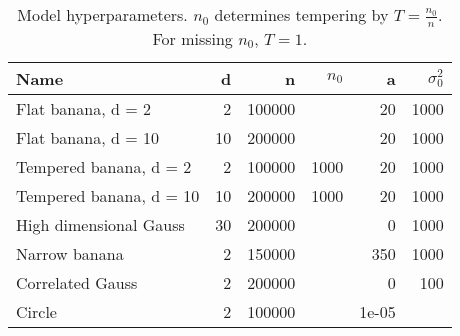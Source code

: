 \begin{table}
\centering
\caption{
            Model hyperparameters. $n_0$ determines tempering by \(T=\frac{n_0}{n}\).
            For missing $n_0$, \(T = 1\).
            }
\label{model_params_table}
\begin{tabular}{lrrrrr}
\toprule
                    Name &   d &       n &  $n_0$ &     a &  $\sigma^2_0$ \\
\midrule
      Flat banana, d = 2 &   2 &  100000 &        &    20 &          1000 \\
     Flat banana, d = 10 &  10 &  200000 &        &    20 &          1000 \\
  Tempered banana, d = 2 &   2 &  100000 &   1000 &    20 &          1000 \\
 Tempered banana, d = 10 &  10 &  200000 &   1000 &    20 &          1000 \\
  High dimensional Gauss &  30 &  200000 &        &     0 &          1000 \\
           Narrow banana &   2 &  150000 &        &   350 &          1000 \\
        Correlated Gauss &   2 &  200000 &        &     0 &           100 \\
                  Circle &   2 &  100000 &        & 1e-05 &               \\
\bottomrule
\end{tabular}
\end{table}
